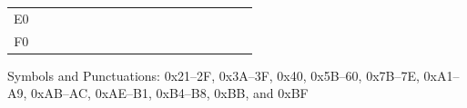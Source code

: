 \begin{table}[H]
{\begin{tabular}{|Sc|Sc|Sc|Sc|Sc|Sc|Sc|Sc|Sc|}
     &  &  &  &  &
     &  \\ \hline
E0 &  &
     &  &  &  &  &
     &  \\ \hline
F0 &  &
     &  &  &  &  &
     &  \\ \hline
\end{tabular}
}
\end{table}

Symbols and Punctuations: 0x21–2F, 0x3A–3F, 0x40, 0x5B–60, 0x7B–7E, 0xA1–A9, 0xAB–AC, 0xAE–B1, 0xB4–B8, 0xBB, and 0xBF